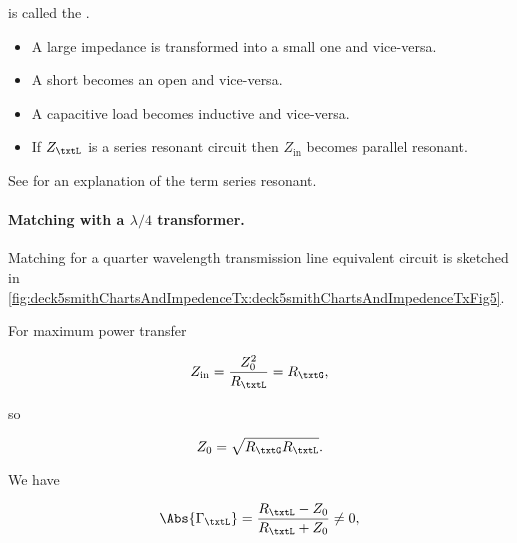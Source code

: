 is called the .

\begin{itemize}
\item A large impedance is transformed into a small one and vice-versa.
\item A short becomes an open and vice-versa.
\item A capacitive load becomes inductive and vice-versa.
\item If \( Z_\txtL \) is a series resonant circuit then \( Z_{\textrm{in}} \) becomes parallel resonant.
\end{itemize}

See \citep{seriesResonance} for an explanation of the term series resonant.

\paragraph{Matching with a \( \lambda/4 \) transformer.}

Matching for a quarter wavelength transmission line equivalent circuit is sketched in \cref{fig:deck5smithChartsAndImpedenceTx:deck5smithChartsAndImpedenceTxFig5}.


For maximum power transfer

\begin{equation}\label{eqn:uwavesDeck5SmithChartCore:300}
Z_{\textrm{in}} = \frac{Z_0^2}{R_\txtL} = R_\txtG, 
\end{equation}

so

\begin{equation}\label{eqn:uwavesDeck5SmithChartCore:320}
Z_0 = \sqrt{ R_\txtG R_\txtL }.
\end{equation}

We have

\begin{equation}\label{eqn:uwavesDeck5SmithChartCore:340}
\Abs{\Gamma_\txtL} = \frac{ R_\txtL - Z_0 }{R_\txtL + Z_0} \ne 0,
\end{equation}

